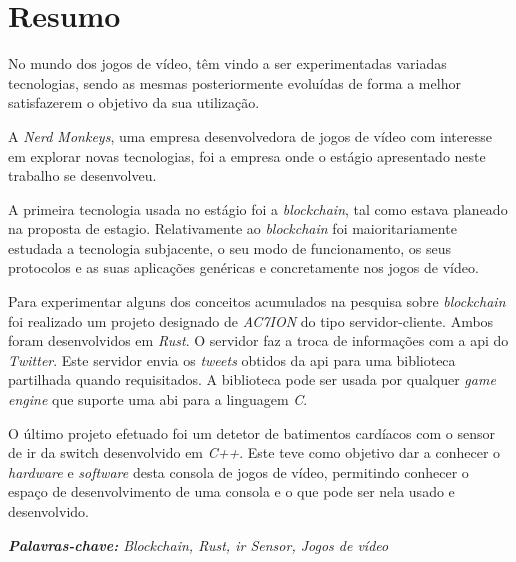 \section*{Resumo}

No mundo dos jogos de vídeo, têm vindo a ser experimentadas variadas tecnologias, sendo as mesmas posteriormente evoluídas de forma a melhor satisfazerem o objetivo da sua utilização.

A \textit{Nerd Monkeys}, uma empresa desenvolvedora de jogos de vídeo com interesse em explorar novas tecnologias, foi a empresa onde o estágio apresentado neste trabalho se desenvolveu.

A primeira tecnologia usada no estágio foi a \textit{blockchain}, tal como estava planeado na proposta de estagio. 
Relativamente ao \textit{blockchain} foi maioritariamente estudada a tecnologia subjacente, o seu modo de funcionamento, os seus protocolos e as suas aplicações genéricas e concretamente nos jogos de vídeo.

Para experimentar alguns dos conceitos acumulados na pesquisa sobre \textit{blockchain} foi realizado um projeto designado de \textit{AC7ION} do tipo servidor-cliente. Ambos foram desenvolvidos em \textit{Rust}. O servidor faz a troca de informações com a \acrfull{api} do \textit{Twitter}. Este servidor envia os \textit{tweets} obtidos da \acrshort{api} para uma biblioteca partilhada quando requisitados. A biblioteca pode ser usada por qualquer \textit{game engine} que suporte uma \acrfull{abi} para a linguagem \textit{C}.

O último projeto efetuado foi um detetor de batimentos cardíacos com o sensor de \acrfull{ir} da \gls{switch} desenvolvido em \textit{C++}. Este teve como objetivo dar a conhecer o \textit{hardware} e \textit{software} desta consola de jogos de vídeo, permitindo conhecer o espaço de desenvolvimento de uma consola e o que pode ser nela usado e desenvolvido.

\textit{\textbf{Palavras-chave:} Blockchain, Rust, \acrshort{ir} Sensor, Jogos de vídeo}
